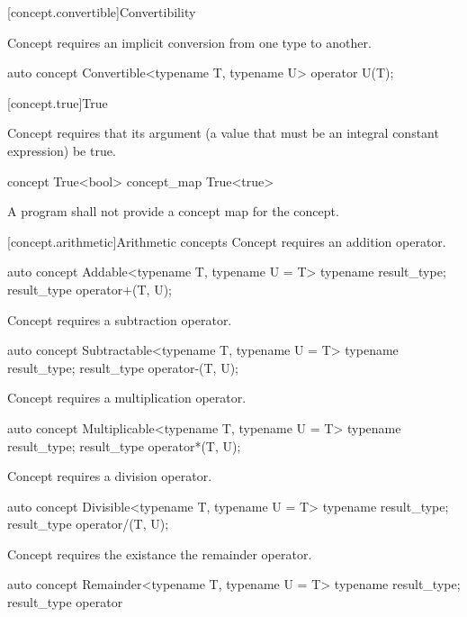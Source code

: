 \documentclass[american,twoside]{book}
\begin{document}
[concept.convertible]{Convertibility}

\pnum
Concept  requires an implicit conversion from one
type to another.

\begin{itemdecl}
auto concept Convertible<typename T, typename U> {
  operator U(T);
}
\end{itemdecl}

[concept.true]{True}

\pnum
Concept  requires that its argument (a  value
that must be an integral constant expression) be true.

\begin{itemdecl}
concept True<bool> { }
concept_map True<true> { }
\end{itemdecl}

\pnum
A program shall not provide a concept map for the
 concept.

[concept.arithmetic]{Arithmetic concepts}
\pnum
Concept  requires an addition operator.
\begin{itemdecl}
auto concept Addable<typename T, typename U = T> {
  typename result_type;
  result_type operator+(T, U);
}
\end{itemdecl}

\pnum
Concept  requires a subtraction operator.
\begin{itemdecl}
auto concept Subtractable<typename T, typename U = T> {
  typename result_type;
  result_type operator-(T, U);
}
\end{itemdecl}

\pnum
Concept  requires a multiplication operator.
\begin{itemdecl}
auto concept Multiplicable<typename T, typename U = T> {
  typename result_type;
  result_type operator*(T, U);
}
\end{itemdecl}

\pnum
Concept  requires a division operator.
\begin{itemdecl}
auto concept Divisible<typename T, typename U = T> {
  typename result_type;
  result_type operator/(T, U);
}
\end{itemdecl}

\pnum
Concept  requires the existance the remainder operator.
\begin{itemdecl}
auto concept Remainder<typename T, typename U = T> {
  typename result_type;
  result_type operator%
}
\end{itemdecl}
\end{document}
